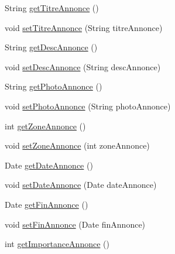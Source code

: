 \begin{DoxyCompactItemize}
\item 
String \hyperlink{classcom_1_1ecetech_1_1bti4_1_1itproject_1_1classified_1_1beans_1_1_annonce_afa38158a832ce611d63293a0c0994c95}{get\+Titre\+Annonce} ()
\item 
void \hyperlink{classcom_1_1ecetech_1_1bti4_1_1itproject_1_1classified_1_1beans_1_1_annonce_acfc02055f10c4df90117ad4f43ba1e5d}{set\+Titre\+Annonce} (String titre\+Annonce)
\item 
String \hyperlink{classcom_1_1ecetech_1_1bti4_1_1itproject_1_1classified_1_1beans_1_1_annonce_a78d0e96eb289e2d40d008087693f3aab}{get\+Desc\+Annonce} ()
\item 
void \hyperlink{classcom_1_1ecetech_1_1bti4_1_1itproject_1_1classified_1_1beans_1_1_annonce_a00c09f990c289eee91b8e122a3a871ac}{set\+Desc\+Annonce} (String desc\+Annonce)
\item 
String \hyperlink{classcom_1_1ecetech_1_1bti4_1_1itproject_1_1classified_1_1beans_1_1_annonce_ab6976a964c743e8d8dd6498f3455b1ba}{get\+Photo\+Annonce} ()
\item 
void \hyperlink{classcom_1_1ecetech_1_1bti4_1_1itproject_1_1classified_1_1beans_1_1_annonce_aeeadd9b210b6f1cca19ac725a579c8e1}{set\+Photo\+Annonce} (String photo\+Annonce)
\item 
int \hyperlink{classcom_1_1ecetech_1_1bti4_1_1itproject_1_1classified_1_1beans_1_1_annonce_a56c931a00718afb347944f27bbe444e8}{get\+Zone\+Annonce} ()
\item 
void \hyperlink{classcom_1_1ecetech_1_1bti4_1_1itproject_1_1classified_1_1beans_1_1_annonce_aaf88c4cb2a08c33550a9c8da00840f88}{set\+Zone\+Annonce} (int zone\+Annonce)
\item 
Date \hyperlink{classcom_1_1ecetech_1_1bti4_1_1itproject_1_1classified_1_1beans_1_1_annonce_ae8b97839d4a0df689326fde23736e3b3}{get\+Date\+Annonce} ()
\item 
void \hyperlink{classcom_1_1ecetech_1_1bti4_1_1itproject_1_1classified_1_1beans_1_1_annonce_aefdf9b6e9769161c1b3b64e454eba346}{set\+Date\+Annonce} (Date date\+Annonce)
\item 
Date \hyperlink{classcom_1_1ecetech_1_1bti4_1_1itproject_1_1classified_1_1beans_1_1_annonce_af5f28bdb12d4525d511f48980aaf1f71}{get\+Fin\+Annonce} ()
\item 
void \hyperlink{classcom_1_1ecetech_1_1bti4_1_1itproject_1_1classified_1_1beans_1_1_annonce_a7882c804d5d322e98432bb28ac43be2a}{set\+Fin\+Annonce} (Date fin\+Annonce)
\item 
int \hyperlink{classcom_1_1ecetech_1_1bti4_1_1itproject_1_1classified_1_1beans_1_1_annonce_ad0c2d6c1db159850a0570dbfddccd7e1}{get\+Importance\+Annonce} ()

\end{DoxyCompactItemize}
